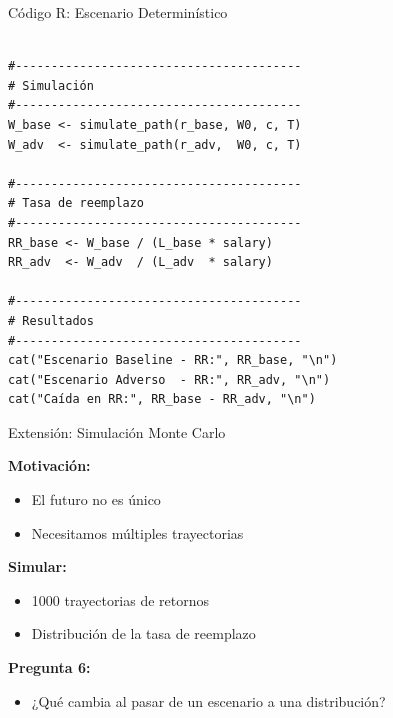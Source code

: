 \documentclass{beamer}
\begin{document}
\begin{frame}[fragile]{Código R: Escenario Determinístico}
\tiny
\begin{verbatim}
    
#----------------------------------------
# Simulación
#----------------------------------------
W_base <- simulate_path(r_base, W0, c, T)
W_adv  <- simulate_path(r_adv,  W0, c, T)

#----------------------------------------
# Tasa de reemplazo
#----------------------------------------
RR_base <- W_base / (L_base * salary)
RR_adv  <- W_adv  / (L_adv  * salary)

#----------------------------------------
# Resultados
#----------------------------------------
cat("Escenario Baseline - RR:", RR_base, "\n")
cat("Escenario Adverso  - RR:", RR_adv, "\n")
cat("Caída en RR:", RR_base - RR_adv, "\n")

\end{verbatim}
    
\end{frame}
\begin{frame}{Extensión: Simulación Monte Carlo}

\textbf{Motivación:}
\begin{itemize}
\item El futuro no es único
\item Necesitamos múltiples trayectorias
\end{itemize}

\vspace{0.4cm}

\textbf{Simular:}
\begin{itemize}
\item 1000 trayectorias de retornos
\item Distribución de la tasa de reemplazo
\end{itemize}

\vspace{0.4cm}

\textbf{Pregunta 6:}
\begin{itemize}
\item ¿Qué cambia al pasar de un escenario a una distribución?
\end{itemize}

\end{frame}
\end{document}

